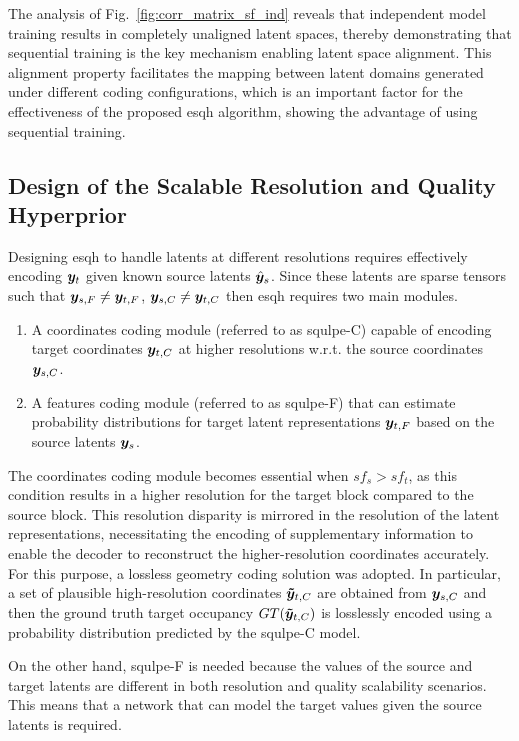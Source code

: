 The analysis of Fig.~\ref{fig:corr_matrix_sf_ind} reveals that independent model training results in completely unaligned latent spaces, thereby demonstrating that sequential training is the key mechanism enabling latent space alignment. This alignment property facilitates the mapping between latent domains generated under different coding configurations, which is an important factor for the effectiveness of the proposed \gls{esqh} algorithm, showing the advantage of using sequential training.

\subsection{Design of the Scalable Resolution and Quality Hyperprior}

Designing \gls{esqh} to handle latents at different resolutions requires effectively encoding $\y_t$ given known source latents $\hat{\y}_s$.
Since these latents are sparse tensors such that $\y_{s, F} \neq \y_{t, F}$, $\y_{s, C} \neq \y_{t, C}$ then \gls{esqh} requires two main modules.
\begin{enumerate}
    \item A coordinates coding module (referred to as \gls{squlpe}-C) capable of encoding target coordinates $\y_{t, C}$ at higher resolutions w.r.t. the source coordinates $\y_{s, C}$.
    \item A features coding module (referred to as \gls{squlpe}-F) that can estimate probability distributions for target latent representations $\y_{t, F}$ based on the source latents $\y_s$.
\end{enumerate}    

The coordinates coding module becomes essential when $sf_s > sf_t$, as this condition results in a higher resolution for the target block compared to the source block. This resolution disparity is mirrored in the resolution of the latent representations, necessitating the encoding of supplementary information to enable the decoder to reconstruct the higher-resolution coordinates accurately. For this purpose, a lossless geometry coding solution was adopted.
In particular, a set of plausible high-resolution coordinates $\boldsymbol{\Tilde{y}}_{t, C}$ are obtained from $\y_{s, C}$ and then the ground truth target occupancy $GT(\boldsymbol{\Tilde{\y}}_{t, C})$ is losslessly encoded using a probability distribution predicted by the \gls{squlpe}-C model.

On the other hand, \gls{squlpe}-F is needed because the values of the source and target latents are different in both resolution and quality scalability scenarios. This means that a network that can model the target values given the source latents is required. 

